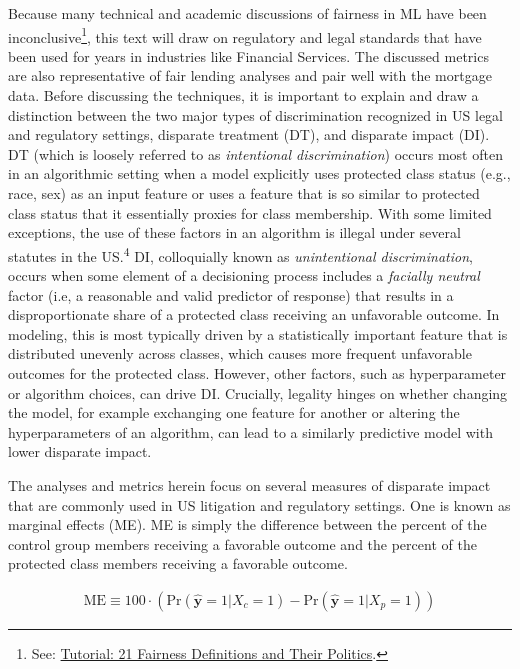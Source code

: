 \documentclass[information,article,submit,moreauthors,pdftex]{definitions/mdpi}
\begin{document}
Because many technical and academic discussions of fairness in ML have been inconclusive\footnote{See: \href{https://www.youtube.com/watch?v=jIXIuYdnyyk}{Tutorial: 21 Fairness Definitions and Their Politics}.}, this text will draw on regulatory and legal standards that have been used for years in industries like Financial Services. The discussed metrics are also representative of fair lending analyses and pair well with the mortgage data. Before discussing the techniques, it is important to explain and draw a distinction between the two major types of discrimination recognized in US legal and regulatory settings, disparate treatment (DT), and disparate impact (DI). DT (which is loosely referred to as \textit{intentional discrimination}) occurs most often in an algorithmic setting when a model explicitly uses protected class status (e.g., race, sex) as an input feature or uses a feature that is so similar to protected class status that it essentially proxies for class membership.  With some limited exceptions, the use of these factors in an algorithm is illegal under several statutes in the US.\textsuperscript{4} DI, colloquially known as \textit{unintentional discrimination}, occurs when some element of a decisioning process includes a \textit{facially neutral} factor (i.e, a reasonable and valid predictor of response) that results in a disproportionate share of a protected class receiving an unfavorable outcome.  In modeling, this is most typically driven by a statistically important feature that is distributed unevenly across classes, which causes more frequent unfavorable outcomes for the protected class.  However, other factors, such as hyperparameter or algorithm choices, can drive DI.  Crucially, legality hinges on whether changing the model, for example exchanging one feature for another or altering the hyperparameters of an algorithm, can lead to a similarly predictive model with lower disparate impact.

The analyses and metrics herein focus on several measures of disparate impact that are commonly used in US litigation and regulatory settings. One is known as marginal effects (ME). ME is simply the difference between the percent of the control group members receiving a favorable outcome and the percent of the protected class members receiving a favorable outcome. 

\begin{equation}
\label{eq:me}
\begin{aligned}
\text{ME} \equiv 100 \cdot (\text{Pr}(\hat{\mathbf{y}} = 1| X_c = 1)  - \text{Pr}(\hat{\mathbf{y}} = 1 | X_p = 1))
\end{aligned}
\end{equation}
\end{document}
